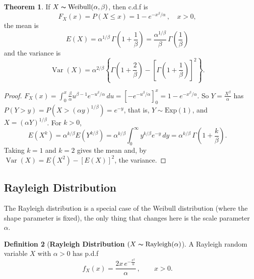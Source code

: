\documentclass[12pt,a4paper]{report}
\theoremstyle{definition}
\newtheorem{thm}{Theorem}[section]
\newtheorem{definition}[thm]{Definition}
\theoremstyle{plain}
\theoremstyle{definition}
\begin{document}
 
\begin{thm}
If $X \thicksim \operatorname{Weibull}(\alpha,\beta)$, then 
c.d.f is \[F_X(x) = P(X \leq x) = 1 - e^{-x^\beta/\alpha}\, ,\quad x>0,\]
the  mean is \[E(X) = \alpha^{1/\beta}\,\Gamma\left(1 + \frac{1}{\beta}\right) = \frac{\alpha^{1/\beta}}{\beta}\,\Gamma\left(\frac{1}{\beta}\right)\]
and the variance is \[\operatorname{Var}(X) = \alpha^{2/\beta}\left\{\Gamma\left(1 + \frac{2}{\beta}\right) - \left[\Gamma\left(1 + \frac{1}{\beta}\right)\right]^2\right\}.\]
\end{thm}

\begin{proof}
$F_X(x) = \int_0^x\frac\beta\alpha u^{\beta - 1}e^{-u^\beta/\alpha}\,du = \left[-e^{-u^\beta/\alpha}\right]_0^x = 1 - e^{-x^\beta/\alpha}$.
So $Y = \frac{X^\beta}{\alpha}$ has $P(Y>y) = P\left(X>(\alpha y)^{1/\beta}\right) = e^{-y}$, that is,
$Y\sim\text{Exp}(1)$, and $X = (\alpha Y)^{1/\beta}$. For $k>0$,
\[E(X^k) = \alpha^{k/\beta}E\left(Y^{k/\beta}\right) = \alpha^{k/\beta}\int_0^\infty y^{k/\beta}e^{-y}\,dy = \alpha^{k/\beta}\,\Gamma\left(1 + \frac k\beta\right).\]
Taking $k = 1$ and $k = 2$ gives the mean and, by $\operatorname{Var}(X) = E(X^2) - [E(X)]^2$, the variance.
\end{proof}


\subsection{Rayleigh Distribution}
\vspace{-15pt}
The Rayleigh distribution is a special case of the Weibull distribution (where the shape parameter is fixed), the only thing that changes here is the scale parameter $\alpha$.

\begin{definition}[\textbf{Rayleigh Distribution $(X\thicksim \operatorname{Rayleigh(\alpha)}$}]
A Rayleigh random variable $X$ with $\alpha > 0$ has p.d.f \[f_X(x) = \frac{2x\, e^{-\frac{x^2}{\alpha}}}{\alpha}\, , \quad\quad x > 0.\]
\end{definition}
\end{document}
